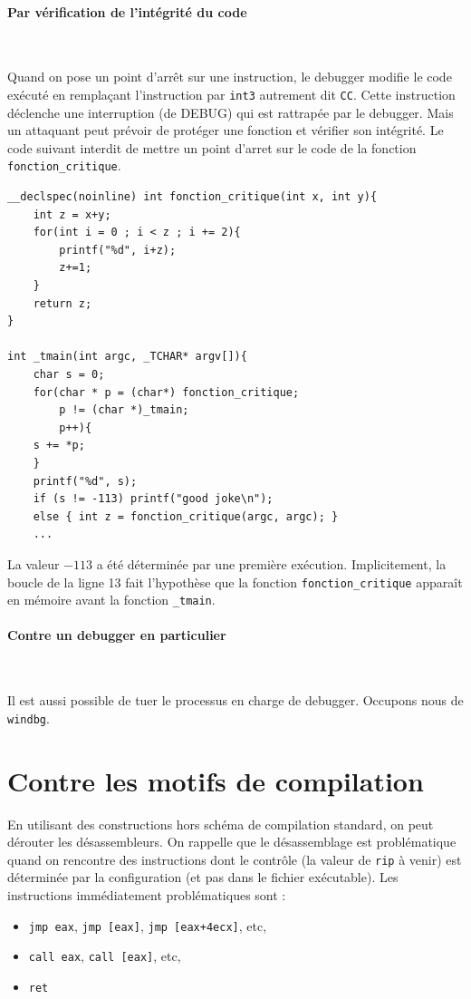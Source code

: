 \documentclass{book}
\newcommand{\code}[1]{\texttt{#1}}
\begin{document}
\paragraph{Par vérification de l'intégrité du code}~

\medskip
Quand on pose un point d'arrêt sur une instruction, le debugger modifie le code exécuté en remplaçant l'instruction par 
\texttt{int3}
autrement dit \code{CC}. Cette instruction déclenche une interruption (de DEBUG) qui est rattrapée par le debugger. Mais un attaquant peut prévoir de protéger une fonction et vérifier son intégrité. Le code suivant interdit de mettre un point d'arret sur le code de la fonction \code{fonction\_critique}.

\begin{verbatim}
__declspec(noinline) int fonction_critique(int x, int y){
	int z = x+y;
	for(int i = 0 ; i < z ; i += 2){
		printf("%d", i+z);
		z+=1;
	}
	return z;
}

int _tmain(int argc, _TCHAR* argv[]){	
	char s = 0;
	for(char * p = (char*) fonction_critique; 
		p != (char *)_tmain; 
		p++){ 
	s += *p;
	}
	printf("%d", s);
	if (s != -113) printf("good joke\n");
	else { int z = fonction_critique(argc, argc); }
	...
\end{verbatim}

La valeur $-113$ a été déterminée par une première exécution. Implicitement, la boucle de la ligne 13 fait l'hypothèse que la fonction \code{fonction\_critique} apparaît en mémoire avant la fonction \code{\_tmain}. 


\paragraph{Contre un debugger en particulier}~

\medskip Il est aussi possible de tuer le processus en charge de debugger. Occupons nous de \code{windbg}. 

\section{Contre les motifs de compilation}

En utilisant des constructions hors schéma de compilation standard, on peut dérouter les désassembleurs. On rappelle que le désassemblage est problématique quand on rencontre des instructions dont le contrôle (la valeur de {\tt rip} à venir) est déterminée par la configuration (et pas dans le fichier exécutable).  Les instructions immédiatement problématiques sont : 
\begin{itemize}
	\item \code{jmp eax}, \code{jmp [eax]}, \code{jmp [eax+4ecx]}, etc,
	\item \code{call eax}, \code{call [eax]}, etc,
	\item \code{ret}
\end{itemize}
\end{document}
